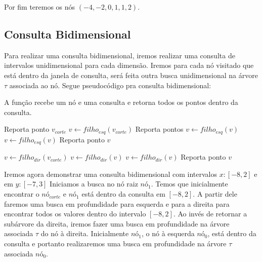 Por fim teremos os nós $(-4, -2, 0, 1, 1, 2)$.

\subsection{Consulta Bidimensional}

Para realizar uma consulta bidimensional, iremos realizar uma consulta de intervalos unidimensional para
cada dimensão. 
Iremos para cada nó visitado que está dentro da janela de consulta, será feita outra busca unidimensional
na árvore $\tau$ associada ao nó.
Segue pseudocódigo pra consulta bidimensional:

\begin{algorithm}[H]
    \caption{A função  recebe um nó e uma consulta e retorna todos
    os pontos dentro da consulta.}
    \begin{algorithmic}[1]
                \State Reporta ponto $v_{corte}$
            \EndIf
        \Else
            \State $v \leftarrow filho_{esq}(v_{corte})$
                    \State Reporta pontos 
                    \State $v \leftarrow filho_{esq}(v)$
                \Else
                    \State $v \leftarrow filho_{esq}(v)$
                \EndIf
            \EndWhile
                \State Reporta ponto $v$
            \EndIf


            \State $v \leftarrow filho_{dir}(v_{corte})$
                    \State {}
                    \State $v \leftarrow filho_{dir}(v)$
                \Else
                    \State $v \leftarrow filho_{dir}(v)$
                \EndIf
            \EndWhile
                \State Reporta ponto $v$
            \EndIf
        \Endif
    \EndFunction
    \end{algorithmic}
\end{algorithm}
\clearpage

Iremos agora demonstrar uma consulta bidimensional com intervalos $x : [-8, 2]$ e em $y : [-7, 3]$
Iniciamos a busca no nó raiz $nó_{1}$. Temos que inicialmente encontrar o $nó_{corte}$ e $nó_{1}$ 
está dentro da consulta em $[-8, 2]$. 
A partir dele faremos uma busca em profundidade para esquerda e para a direita para encontrar todos 
os valores dentro do intervalo $[-8,2]$. 
Ao invés de retornar a subárvore da direita, iremos fazer uma busca em profundidade na árvore associada
$\tau$ do nó à direita. 
Inicialmente $nó_{1}$, o nó à esquerda $nó_{0}$, está dentro da consulta e portanto realizaremos uma
busca em profundidade na árvore $\tau$ associada $nó_{0}$.




